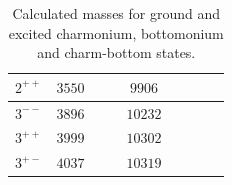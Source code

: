 \begin{table}[!t]
\begin{center}
\begin{tabular}{c|ccc|ccc||c|c}
$2^{++}$    & $3550$  &        &        & $9906$   &        &    	&      &                                      \\
\hline                                                                                                                                                                                                     
$3^{--}$    & $3896$ &         &        & $10232$  &        &    	&      &                                           \\
$3^{++}$    & $3999$ &         &        & $10302$  &        &    	&       &                                     \\
$3^{+-}$    & $4037$ &         &        & $10319$  &        &    	&      &                                                   \\                                                                                                                                                                      
\hline
\hline
\end{tabular}
\caption{Calculated masses for ground and excited charmonium, bottomonium and charm-bottom states.}\label{tab:results}
\end{center}
\end{table}

%
%
%
%
%
